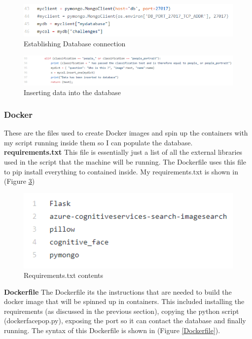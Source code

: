 \documentclass[12pt,a4paper]{article}
\begin{document}
\begin{figure}[h]
    \centering
    \includegraphics[width=1.0\textwidth]{Figs/dbinsert1.PNG} 
    \caption{Establishing Database connection} 
    \label{dbinsert1}
\end{figure}  

\begin{figure}[h]
    \centering
    \includegraphics[width=1.0\textwidth]{Figs/dbinsert2.PNG} 
    \caption{Inserting data into the database} 
    \label{dbinsert2}
\end{figure} 

\subsubsection{Docker}   
These are the files used to create Docker images and spin up the containers with my script running inside them so I can populate the database. 
\textbf{requirements.txt}   
This file is essentially just a list of all the external libraries used in the script that the machine will be running. The Dockerfile uses this file to pip install everything to contained inside. My requirements.txt is shown in (Figure \ref{req}) 

\begin{figure}[h]
    \centering
    \includegraphics[width=1.0\textwidth]{Figs/requirements.PNG} 
    \caption{Requirements.txt contents} 
    \label{req}
\end{figure} 

\textbf{Dockerfile} 
The Dockerfile its the instructions that are needed to build the docker image that will be spinned up in containers.  This included installing the requirements (as discussed in the previous section), copying the python script (docker\textunderscore face\textunderscore pop.py), exposing the port so it can contact the database and finally running. The syntax of this Dockerfile is shown in (Figure \ref{Dockerfile}). 
\end{document}
